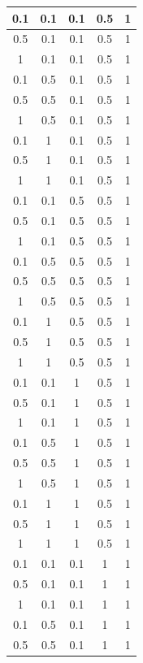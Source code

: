 \begin{table}[htbp]
{\begin{minipage}{\textwidth}
\begin{tabular}{||c c c c c||}
				\hline
				0.1 & 0.1 & 0.1 & 0.5 & 1 \\ 
				\hline
				0.5 & 0.1 & 0.1 & 0.5 & 1 \\ 
				\hline
				1 & 0.1 & 0.1 & 0.5 & 1 \\ 
				\hline
				0.1 & 0.5 & 0.1 & 0.5 & 1 \\ 
				\hline
				0.5 & 0.5 & 0.1 & 0.5 & 1 \\ 
				\hline
				1 & 0.5 & 0.1 & 0.5 & 1 \\ 
				\hline
				0.1 & 1 & 0.1 & 0.5 & 1 \\ 
				\hline
				0.5 & 1 & 0.1 & 0.5 & 1 \\ 
				\hline
				1 & 1 & 0.1 & 0.5 & 1 \\ 
				\hline
				0.1 & 0.1 & 0.5 & 0.5 & 1 \\ 
				\hline
				0.5 & 0.1 & 0.5 & 0.5 & 1 \\ 
				\hline
				1 & 0.1 & 0.5 & 0.5 & 1 \\ 
				\hline
				0.1 & 0.5 & 0.5 & 0.5 & 1 \\ 
				\hline
				0.5 & 0.5 & 0.5 & 0.5 & 1 \\ 
				\hline
				1 & 0.5 & 0.5 & 0.5 & 1 \\ 
				\hline
				0.1 & 1 & 0.5 & 0.5 & 1 \\ 
				\hline
				0.5 & 1 & 0.5 & 0.5 & 1 \\ 
				\hline
				1 & 1 & 0.5 & 0.5 & 1 \\ 
				\hline
				0.1 & 0.1 & 1 & 0.5 & 1 \\ 
				\hline
				0.5 & 0.1 & 1 & 0.5 & 1 \\ 
				\hline
				1 & 0.1 & 1 & 0.5 & 1 \\ 
				\hline
				0.1 & 0.5 & 1 & 0.5 & 1 \\ 
				\hline
				0.5 & 0.5 & 1 & 0.5 & 1 \\ 
				\hline
				1 & 0.5 & 1 & 0.5 & 1 \\ 
				\hline
				0.1 & 1 & 1 & 0.5 & 1 \\ 
				\hline
				0.5 & 1 & 1 & 0.5 & 1 \\ 
				\hline
				1 & 1 & 1 & 0.5 & 1 \\ 
				\hline
				0.1 & 0.1 & 0.1 & 1 & 1 \\ 
				\hline
				0.5 & 0.1 & 0.1 & 1 & 1 \\ 
				\hline
				1 & 0.1 & 0.1 & 1 & 1 \\ 
				\hline
				0.1 & 0.5 & 0.1 & 1 & 1 \\ 
				\hline
				0.5 & 0.5 & 0.1 & 1 & 1 \\ 

\end{tabular}
\end{minipage}}
\end{table}
